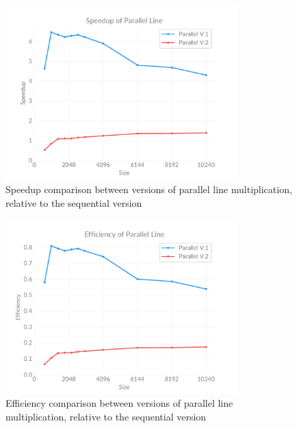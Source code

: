     \begin{figure}[ht]
        \centering
        \captionsetup{justification=centering, margin=1.2cm}
        \includegraphics[width=0.8\textwidth]{pdf/parallel-speedup}
        \caption{Speedup comparison between versions of parallel line multiplication, relative to the sequential version}
        \label{fig:chart:parallel-speedup}
    \end{figure}

    \begin{figure}[ht]
        \centering
        \captionsetup{justification=centering, margin=1.2cm}
        \includegraphics[width=0.8\textwidth]{pdf/parallel-efficiency}
        \caption{Efficiency comparison between versions of parallel line multiplication, relative to the sequential version}
        \label{fig:chart:parallel-efficiency}
    \end{figure}

\clearpage